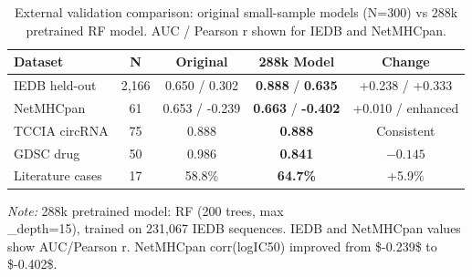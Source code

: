 \begin{table}[htbp]
\centering
\caption{External validation comparison: original small-sample models (N=300) vs 288k pretrained RF model. AUC / Pearson r shown for IEDB and NetMHCpan.}
\label{tab:pretrained_validation}
\begin{tabular}{lcccc}
\toprule
Dataset & N & Original & 288k Model & Change \\
\midrule
IEDB held-out & 2,166 & 0.650 / 0.302 & \textbf{0.888} / \textbf{0.635} & +0.238 / +0.333 \\
NetMHCpan & 61 & 0.653 / -0.239 & \textbf{0.663} / \textbf{-0.402} & +0.010 / enhanced \\
TCCIA circRNA & 75 & 0.888 & \textbf{0.888} & Consistent \\
GDSC drug & 50 & 0.986 & \textbf{0.841} & $-0.145$ \\
Literature cases & 17 & 58.8\% & \textbf{64.7\%} & +5.9\% \\
\bottomrule
\end{tabular}
\footnotesize {\textit{Note:} 288k pretrained model: RF (200 trees, max\\_depth=15), trained on 231,067 IEDB sequences. IEDB and NetMHCpan values show AUC/Pearson r. NetMHCpan corr(logIC50) improved from \$-0.239\$ to \$-0.402\$.}
\end{table}
